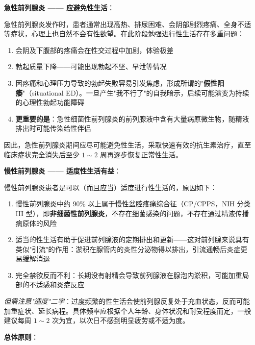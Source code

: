 \begin{enumerate}
\vspace{0.5em}
\noindent\textbf{急性前列腺炎 —— 应避免性生活}：

急性前列腺炎发作时，患者通常出现高热、排尿困难、会阴部剧烈疼痛、全身不适等症状，心理上也自然不会有性欲望。在此阶段勉强进行性生活存在多重问题：

\begin{enumerate}
	\item 会阴及下腹部的疼痛会在性交过程中加剧，体验极差
	\item 勃起质量下降——可能出现勃起不坚、早泄等情况
	\item 因疼痛和心理压力导致的勃起失败容易引发焦虑，形成所谓的"\textbf{假性阳痿}"（situational ED）。一旦产生"我不行了"的自我暗示，后续可能演变为持续的心理性勃起功能障碍
	\item \textbf{更重要的是}：急性细菌性前列腺炎的前列腺液中含有大量病原微生物，随精液排出时可能传染给性伴侣
\end{enumerate}

因此，急性前列腺炎期间应尽可能避免性生活，采取快速有效的抗生素治疗，直至临床症状完全消失后至少 $1\sim2$ 周再逐步恢复正常性生活。

\vspace{0.5em}
\noindent\textbf{慢性前列腺炎 —— 适度性生活有益}：

慢性前列腺炎患者是可以（而且应当）适度进行性生活的，原因如下：

\begin{enumerate}
	\item 慢性前列腺炎中约 90\% 以上属于慢性盆腔疼痛综合征（CP/CPPS，NIH 分类 III 型），即\textbf{非细菌性前列腺炎}，不存在细菌感染的问题，不存在通过精液传播病原体的风险

	\item 适当的性生活有助于促进前列腺液的定期排出和更新——这对前列腺来说具有类似"引流"的作用：淤积在腺管内的炎性分泌物得以排出，引流通畅后炎症更易缓解消退

	\item 完全禁欲反而不利：长期没有射精会导致前列腺液在腺泡内淤积，可能加重局部的不适感和炎症反应
\end{enumerate}

\noindent\textit{但需注意"适度"二字}：过度频繁的性生活会使前列腺反复处于充血状态，反而可能加重症状、延长病程。具体频率应根据个人年龄、身体状况和耐受程度而定，一般建议每周 $1\sim2$ 次为宜，以次日不感到明显疲劳或不适为度。

\vspace{0.5em}
\noindent\textbf{总体原则}：


\end{enumerate}
